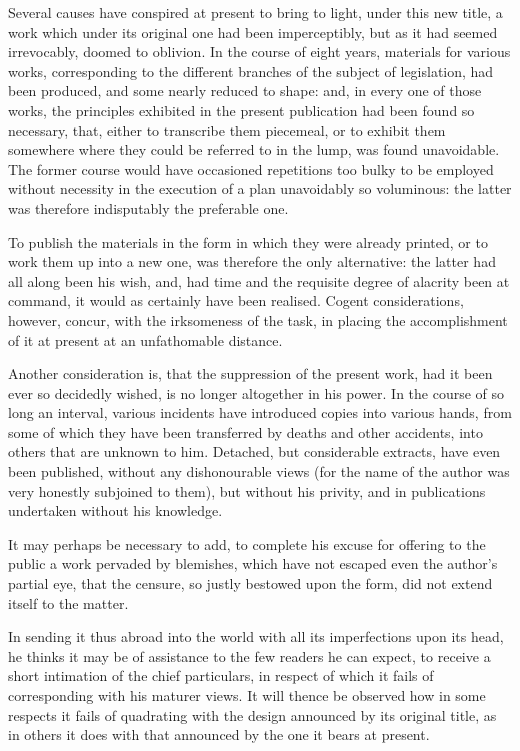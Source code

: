 \documentclass[12pt]{report}
\begin{document}
Several causes have conspired at present to bring to light, under this
new title, a work which under its original one had been imperceptibly,
but as it had seemed irrevocably, doomed to oblivion. In the course of
eight years, materials for various works, corresponding to the different
branches of the subject of legislation, had been produced, and some
nearly reduced to shape: and, in every one of those works, the
principles exhibited in the present publication had been found so
necessary, that, either to transcribe them piecemeal, or to exhibit them
somewhere where they could be referred to in the lump, was found
unavoidable. The former course would have occasioned repetitions too
bulky to be employed without necessity in the execution of a plan
unavoidably so voluminous: the latter was therefore indisputably the
preferable one.

To publish the materials in the form in which they were already printed,
or to work them up into a new one, was therefore the only alternative:
the latter had all along been his wish, and, had time and the requisite
degree of alacrity been at command, it would as certainly have been
realised. Cogent considerations, however, concur, with the irksomeness
of the task, in placing the accomplishment of it at present at an
unfathomable distance.

Another consideration is, that the suppression of the present work, had
it been ever so decidedly wished, is no longer altogether in his power.
In the course of so long an interval, various incidents have introduced
copies into various hands, from some of which they have been transferred
by deaths and other accidents, into others that are unknown to him.
Detached, but considerable extracts, have even been published, without
any dishonourable views (for the name of the author was very honestly
subjoined to them), but without his privity, and in publications
undertaken without his knowledge.

It may perhaps be necessary to add, to complete his excuse for offering
to the public a work pervaded by blemishes, which have not escaped even
the author's partial eye, that the censure, so justly bestowed upon the
form, did not extend itself to the matter.

In sending it thus abroad into the world with all its imperfections upon
its head, he thinks it may be of assistance to the few readers he can
expect, to receive a short intimation of the chief particulars, in
respect of which it fails of corresponding with his maturer views. It
will thence be observed how in some respects it fails of quadrating with
the design announced by its original title, as in others it does with
that announced by the one it bears at present.
\end{document}
